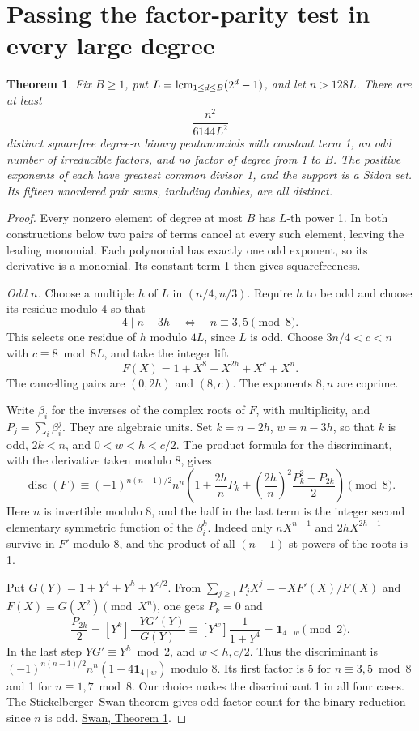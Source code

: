\documentclass[11pt]{article}
\newtheorem{theorem}{Theorem}
\begin{document}
\section{Passing the factor-parity test in every large degree}
\begin{theorem}\label{thm:parity}
Fix \(B\ge1\), put \(L=\mathop{\rm lcm}_{1\le d\le B}(2^d-1)\), and let
\(n>128L\). There are at least
\[
                      \frac{n^2}{6144L^2}
\]
distinct squarefree degree-\(n\) binary pentanomials with constant term 1,
an odd number of irreducible factors, and no factor of degree from 1 to \(B\).
The positive exponents of each have greatest common divisor 1, and the
support is a Sidon set. Its fifteen unordered pair sums, including doubles,
are all distinct.
\end{theorem}
\begin{proof}
Every nonzero element of degree at most \(B\) has \(L\)-th power 1.
In both constructions below two pairs of terms cancel at every such
element, leaving the leading monomial. Each polynomial has exactly one
odd exponent, so its derivative is a monomial. Its constant term 1
then gives squarefreeness.

\emph{Odd \(n\).} Choose a multiple \(h\) of \(L\) in \((n/4,n/3)\).
Require \(h\) to be odd and choose its residue modulo 4 so that
\[
        4\mid n-3h \quad\Longleftrightarrow\quad n\equiv3,5\pmod8 .
\]
This selects one residue of \(h\) modulo \(4L\), since \(L\) is odd.
Choose \(3n/4<c<n\) with \(c\equiv8\bmod 8L\), and take the integer lift
\[
              F(X)=1+X^8+X^{2h}+X^c+X^n .
\]
The cancelling pairs are \((0,2h)\) and \((8,c)\). The exponents \(8,n\)
are coprime.

Write \(\beta_i\) for the inverses of the complex roots of \(F\), with
multiplicity, and \(P_j=\sum_i\beta_i^j\). They are algebraic units.
Set \(k=n-2h\), \(w=n-3h\), so that \(k\) is odd, \(2k<n\), and
\(0<w<h<c/2\). The product formula for the discriminant, with the
derivative taken modulo 8, gives
\[
 \operatorname{disc}(F)\equiv(-1)^{n(n-1)/2}n^n
 \left(1+\frac{2h}{n}P_k+
       \left(\frac{2h}{n}\right)^2\frac{P_k^2-P_{2k}}2\right)\pmod8 .
\]
Here \(n\) is invertible modulo 8, and the half in the last term is the
integer second elementary symmetric function of the \(\beta_i^k\).
Indeed only \(nX^{n-1}\) and \(2hX^{2h-1}\) survive in \(F'\) modulo 8,
and the product of all \((n-1)\)-st powers of the roots is 1.

Put \(G(Y)=1+Y^4+Y^h+Y^{c/2}\). From
\(\sum_{j\ge1}P_jX^j=-XF'(X)/F(X)\) and
\(F(X)\equiv G(X^2)\pmod{X^n}\), one gets \(P_k=0\) and
\[
 \frac{P_{2k}}2=[Y^k]\frac{-YG'(Y)}{G(Y)}
 \equiv [Y^{w}]\frac1{1+Y^4}=\mathbf 1_{4\mid w}\pmod2 .
\]
In the last step \(YG'\equiv Y^h\bmod2\), and \(w<h,c/2\).
Thus the discriminant is \((-1)^{n(n-1)/2}n^n(1+4\mathbf 1_{4\mid w})\)
modulo 8. Its first factor is 5 for \(n\equiv3,5\bmod8\) and 1 for
\(n\equiv1,7\bmod8\). Our choice makes the discriminant 1 in all four
cases. The Stickelberger--Swan theorem gives odd factor count for the
binary reduction since \(n\) is odd.
\href{https://doi.org/10.2140/pjm.1962.12.1099}{Swan, Theorem 1}.


\end{proof}
\end{document}

